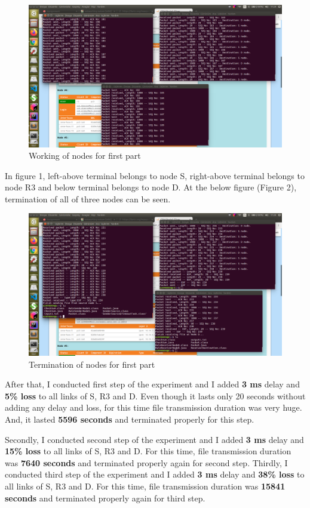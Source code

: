 \documentclass[12pt]{article}
\begin{document}
\begin{figure}[h!]
  \includegraphics[width=\linewidth]{e1start.png}
  \caption{Working of nodes for first part}
\end{figure}

In figure 1, left-above terminal belongs to node S, right-above terminal belongs to node R3 and below terminal belongs to node D. At the below figure (Figure 2), termination of all of three nodes can be seen.

\begin{figure}[h!]
  \includegraphics[width=\linewidth]{e1fin.png}
  \caption{Termination of nodes for first part}
\end{figure}

After that, I conducted first step of the experiment and I added \textbf{3 ms} delay and \textbf{5\% loss} to all links of S, R3 and D. Even though it lasts only 20 seconds without adding any delay and loss, for this time file transmission duration was very huge. And, it lasted \textbf{5596 seconds} and terminated properly for this step.

Secondly, I conducted second step of the experiment and I added \textbf{3 ms} delay and \textbf{15\% loss} to all links of S, R3 and D. For this time, file transmission duration was \textbf{7640 seconds} and terminated properly again for second step. Thirdly, I conducted third step of the experiment and I added \textbf{3 ms} delay and \textbf{38\% loss} to all links of S, R3 and D. For this time, file transmission duration was \textbf{15841 seconds} and terminated properly again for third step.
\end{document}
